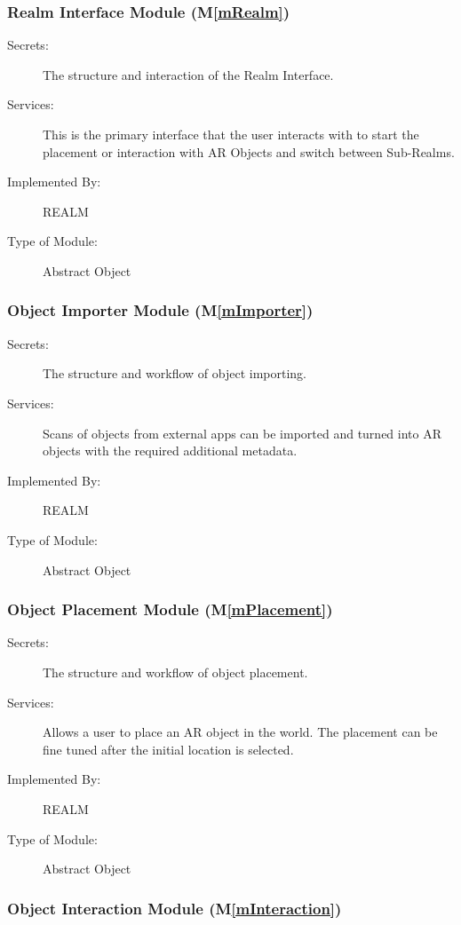 \documentclass[12pt, titlepage]{article}
\newcommand{\mref}[1]{M\ref{#1}}
\begin{document}
\subsubsection{Realm Interface Module (\mref{mRealm})}

\begin{description}
\item[Secrets:]The structure and interaction of the Realm Interface.
\item[Services:]This is the primary interface that the user interacts with to start the placement or interaction with AR Objects and switch between Sub-Realms.
\item[Implemented By:]REALM
\item[Type of Module:]Abstract Object
\end{description}

\subsubsection{Object Importer Module (\mref{mImporter})}

\begin{description}
\item[Secrets:]The structure and workflow of object importing.
\item[Services:]Scans of objects from external apps can be imported and turned into AR objects with the required additional metadata.
\item[Implemented By:]REALM
\item[Type of Module:]Abstract Object
\end{description}

\subsubsection{Object Placement Module (\mref{mPlacement})}

\begin{description}
\item[Secrets:]The structure and workflow of object placement.
\item[Services:]Allows a user to place an AR object in the world. The placement can be fine tuned after the initial location is selected.
\item[Implemented By:]REALM
\item[Type of Module:]Abstract Object
\end{description}

\subsubsection{Object Interaction Module (\mref{mInteraction})}
\end{document}

